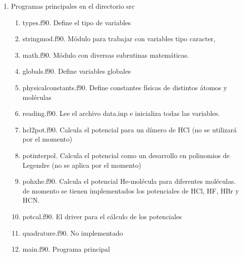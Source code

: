 \documentclass[letterpaper,12pt]{article}
\begin{document}
\begin{enumerate}
               
               \item Programas principales en el directorio src
               \begin{enumerate}
               \item types.f90. Define el tipo de variables
               \item stringmod.f90. Módulo para trabajar con variables tipo caracter,
               \item math.f90. Módulo con diversas subrutinas matemáticas.
               \item globals.f90. Define variables globales
               \item physicalconstants.f90. Define constantes físicas de distintos átomos y moléculas
               \item reading.f90. Lee el archivo data.inp e inicializa todas las variables.
               \item hcl2pot.f90. Calcula el potencial para un dímero de HCl (no se utilizará por el momento)
               \item potinterpol. Calcula el potencial como un desarrollo en polinomios de Legendre (no se aplica por el momento)
               \item pohxhe.f90. Calcula el potencial He-molécula para diferentes moléculas. de momento se tienen implementados los potenciales de HCl, HF, HBr y HCN. 
               \item potcal.f90. El driver para el cálculo de los potenciales
               \item quadrature.f90. No implementado
               \item main.f90. Programa principal
               
              
               \end{enumerate}
               \end{enumerate}
               
               
      
       
\end{document}
